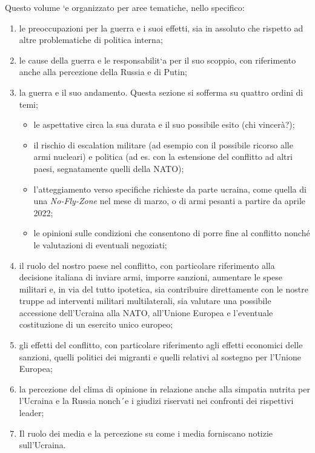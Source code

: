 \documentclass[
  openany]{book}
\begin{document}
Questo volume `e organizzato per aree tematiche, nello specifico:

\begin{enumerate}
\def\labelenumi{\arabic{enumi}.}
\item
  le preoccupazioni per la guerra e i suoi effetti, sia in assoluto che rispetto ad altre
  problematiche di politica interna;
\item
  le cause della guerra e le responsabilit`a per il suo scoppio, con riferimento anche
  alla percezione della Russia e di Putin;
\item
  la guerra e il suo andamento. Questa sezione si sofferma su quattro ordini di temi;

  \begin{itemize}
  \item
    le aspettative circa la sua durata e il suo possibile esito (chi vincerà?);
  \item
    il rischio di escalation militare (ad esempio con il possibile ricorso alle armi
    nucleari) e politica (ad es. con la estensione del conflitto ad altri paesi,
    segnatamente quelli della NATO);
  \item
    l'atteggiamento verso specifiche richieste da parte ucraina, come quella di
    una \emph{No-Fly-Zone} nel mese di marzo, o di armi pesanti a partire da aprile 2022;
  \item
    le opinioni sulle condizioni che consentono di porre fine al conflitto nonché
    le valutazioni di eventuali negoziati;
  \end{itemize}
\item
  il ruolo del nostro paese nel conflitto, con particolare riferimento alla decisione
  italiana di inviare armi, imporre sanzioni, aumentare le spese militari e, in via del
  tutto ipotetica, sia contribuire direttamente con le nostre truppe ad interventi militari
  multilaterali, sia valutare una possibile accessione dell'Ucraina alla NATO, all'Unione Europea e l'eventuale costituzione di un esercito unico europeo;
\item
  gli effetti del conflitto, con particolare riferimento agli effetti economici delle
  sanzioni, quelli politici dei migranti e quelli relativi al sostegno per l'Unione
  Europea;
\item
  la percezione del clima di opinione in relazione anche alla simpatia nutrita per
  l'Ucraina e la Russia nonch´e i giudizi riservati nei confronti dei rispettivi leader;
\item
  Il ruolo dei media e la percezione su come i media forniscano notizie sull'Ucraina.
\end{enumerate}
\end{document}
